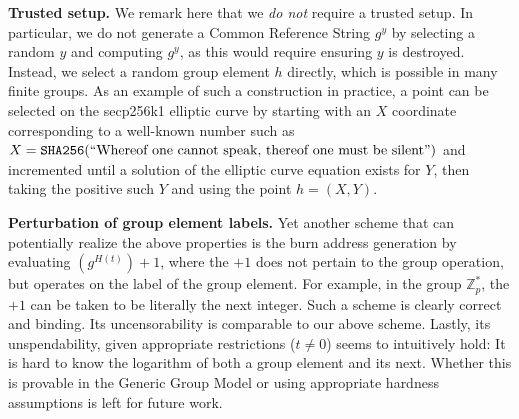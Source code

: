 \noindent
\textbf{Trusted setup.}
We remark here that we \emph{do not} require a trusted setup. In particular, we do not generate a Common Reference String $g^y$ by selecting a random $y$ and computing $g^y$, as this would require ensuring $y$ is destroyed. Instead, we select a random group element $h$ directly, which is possible in many finite groups. As an example of such a construction in practice, a point can be selected on the secp256k1 elliptic curve by starting with an $X$ coordinate corresponding to a well-known number such as $X = \texttt{SHA256}(\text{``Whereof one cannot speak, thereof one must be silent''})$ and incremented until a solution of the elliptic curve equation exists for $Y$, then taking the positive such $Y$ and using the point $h = (X, Y)$.

\noindent
\textbf{Perturbation of group element labels.}
Yet another scheme that can potentially realize the above properties is the burn
address generation by evaluating $(g^{H(t)}) + 1$, where the $+1$ does not pertain to
the group operation, but operates on the label of the group element. For
example, in the group $\mathbb{Z}_p^*$, the $+1$ can be taken to be literally
the next integer. Such a scheme is clearly correct and binding. Its
uncensorability is comparable to our above scheme. Lastly, its unspendability,
given appropriate restrictions ($t \neq 0$) seems to intuitively hold: It is
hard to know the logarithm of both a group element and its next. Whether this is
provable in the Generic Group Model or using appropriate hardness assumptions is
left for future work.
